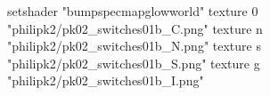 setshader "bumpspecmapglowworld"
    texture 0 "philipk2/pk02_switches01b_C.png"
    texture n "philipk2/pk02_switches01b_N.png"
    texture s "philipk2/pk02_switches01b_S.png"
    texture g "philipk2/pk02_switches01b_I.png"